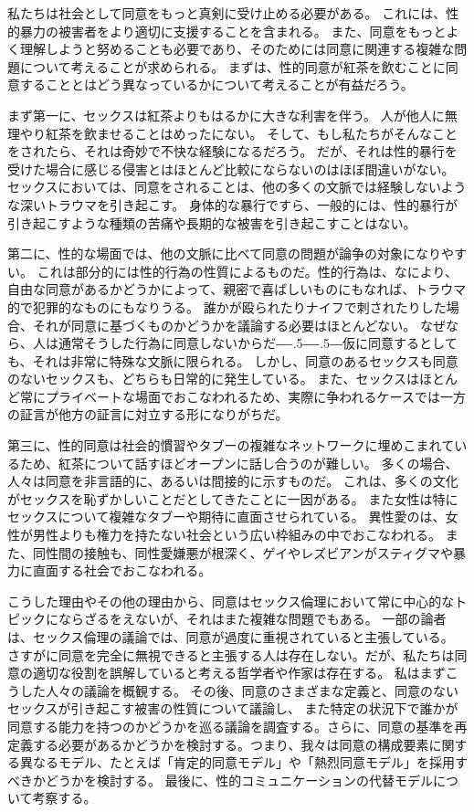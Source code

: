 \documentclass[paper=a4,book,openany]{jlreq}
\def\DDASH{―\kern-.5\zw―\kern-.5\zw―} %
\begin{document}
私たちは社会として同意をもっと真剣に受け止める必要がある。
これには、性的暴力の被害者をより適切に支援することを含まれる。
また、同意をもっとよく理解しようと努めることも必要であり、そのためには同意に関連する複雑な問題について考えることが求められる。
まずは、性的同意が紅茶を飲むことに同意することとはどう異なっているかについて考えることが有益だろう。

まず第一に、セックスは紅茶よりもはるかに大きな利害を伴う。
人が他人に無理やり紅茶を飲ませることはめったにない。
そして、もし私たちがそんなことをされたら、それは奇妙で不快な経験になるだろう。
だが、それは性的暴行を受けた場合に感じる侵害とはほとんど比較にならないのはほぼ間違いがない。
セックスにおいては、同意をされることは、他の多くの文脈では経験しないような深いトラウマを引き起こす。
身体的な暴行ですら、一般的には、性的暴行が引き起こすような種類の苦痛や長期的な被害を引き起こすことはない。

第二に、性的な場面では、他の文脈に比べて同意の問題が論争の対象になりやすい。
これは部分的には性的行為の性質によるものだ。性的行為は、なにより、自由な同意があるかどうかによって、親密で喜ばしいものにもなれば、トラウマ的で犯罪的なものにもなりうる。
誰かが殴られたりナイフで刺されたりした場合、それが同意に基づくものかどうかを議論する必要はほとんどない。
なぜなら、人は通常そうした行為に同意しないからだ{\DDASH}仮に同意するとしても、それは非常に特殊な文脈に限られる。
しかし、同意のあるセックスも同意のないセックスも、どちらも日常的に発生している。
また、セックスはほとんど常にプライベートな場面でおこなわれるため、実際に争われるケースでは一方の証言が他方の証言に対立する形になりがちだ。

第三に、性的同意は社会的慣習やタブーの複雑なネットワークに埋めこまれているため、紅茶について話すほどオープンに話し合うのが難しい。
多くの場合、人々は同意を非言語的に、あるいは間接的に示すものだ。
これは、多くの文化がセックスを恥ずかしいことだとしてきたことに一因がある。
また女性は特にセックスについて複雑なタブーや期待に直面させられている。
異性愛のは、女性が男性よりも権力を持たない社会という広い枠組みの中でおこなわれる。
また、同性間の接触も、同性愛嫌悪が根深く、ゲイやレズビアンがスティグマや暴力に直面する社会でおこなわれる。

こうした理由やその他の理由から、同意はセックス倫理において常に中心的なトピックにならざるをえないが、それはまた複雑な問題でもある。
一部の論者は、セックス倫理の議論では、同意が過度に重視されていると主張している。
さすがに同意を完全に無視できると主張する人は存在しない。だが、私たちは同意の適切な役割を誤解していると考える哲学者や作家は存在する。
私はまずこうした人々の議論を概観する。
その後、同意のさまざまな定義と、同意のないセックスが引き起こす被害の性質について議論し、
また特定の状況下で誰かが同意する能力を持つのかどうかを巡る議論を調査する。さらに、同意の基準を再定義する必要があるかどうかを検討する。つまり、我々は同意の構成要素に関する異なるモデル、たとえば「肯定的同意モデル」や「熱烈同意モデル」を採用すべきかどうかを検討する。
最後に、性的コミュニケーションの代替モデルについて考察する。
\end{document}
